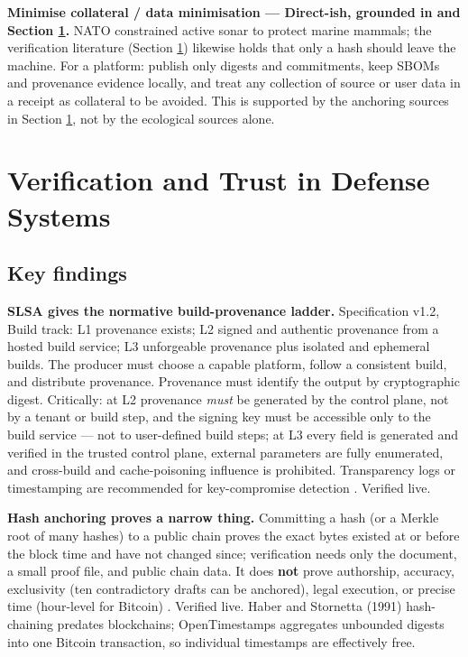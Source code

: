 \documentclass[11pt]{article}
\begin{document}
\textbf{Minimise collateral / data minimisation --- Direct-ish, grounded
in \cite{nato-topic} and Section \ref{sec:verification}.} NATO
constrained active sonar to protect marine mammals; the verification
literature (Section \ref{sec:verification}) likewise holds that only a
hash should leave the machine. For a platform: publish only
digests and commitments, keep SBOMs and provenance evidence locally, and
treat any collection of source or user data in a receipt as collateral
to be avoided. This is supported by the anchoring sources in
Section \ref{sec:verification}, not by the ecological sources alone.

\section{Verification and Trust in Defense Systems}
\label{sec:verification}

\subsection{Key findings}

\textbf{SLSA gives the normative build-provenance ladder.}
Specification v1.2, Build track: L1 provenance exists; L2 signed and
authentic provenance from a hosted build service; L3 unforgeable
provenance plus isolated and ephemeral builds. The producer must choose
a capable platform, follow a consistent build, and distribute
provenance. Provenance must identify the output by cryptographic digest.
Critically: at L2 provenance \emph{must} be generated by the control
plane, not by a tenant or build step, and the signing key must be
accessible only to the build service --- not to user-defined build
steps; at L3 every field is generated and verified in the trusted
control plane, external parameters are fully enumerated, and
cross-build and cache-poisoning influence is prohibited. Transparency
logs or timestamping are recommended for key-compromise detection
\cite{slsa}. Verified live.

\textbf{Hash anchoring proves a narrow thing.} Committing a hash (or a
Merkle root of many hashes) to a public chain proves the exact bytes
existed at or before the block time and have not changed since;
verification needs only the document, a small proof file, and public
chain data. It does \textbf{not} prove authorship, accuracy,
exclusivity (ten contradictory drafts can be anchored), legal execution,
or precise time (hour-level for Bitcoin) \cite{filigrane2026}. Verified
live. Haber and Stornetta (1991) hash-chaining predates blockchains;
OpenTimestamps aggregates unbounded digests into one Bitcoin
transaction, so individual timestamps are effectively free.
\end{document}
